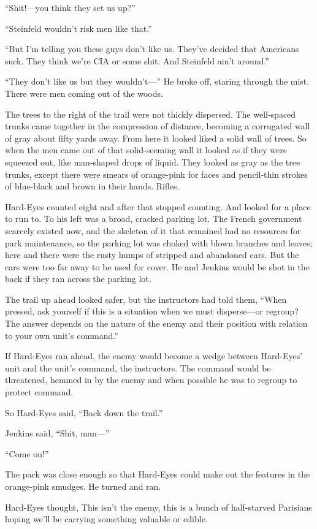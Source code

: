 ``Shit!—you think they set us up?''

``Steinfeld wouldn't risk men like that.''

``But I'm telling you these guys don't like us. They've decided that Americans suck. They think we're CIA or some shit. And Steinfeld ain't around.''

``They don't like us but they wouldn't—'' He broke off, staring through the mist. There were men coming out of the woods.

The trees to the right of the trail were not thickly dispersed. The well-spaced trunks came together in the compression of distance, becoming a corrugated wall of gray about fifty yards away. From here it looked liked a solid wall of trees. So when the men came out of that solid-seeming wall it looked as if they were squeezed out, like man-shaped drops of liquid. They looked as gray as the tree trunks, except there were smears of orange-pink for faces and pencil-thin strokes of blue-black and brown in their hands. Rifles.

Hard-Eyes counted eight and after that stopped counting. And looked for a place to run to. To his left was a broad, cracked parking lot. The French government scarcely existed now, and the skeleton of it that remained had no resources for park maintenance, so the parking lot was choked with blown branches and leaves; here and there were the rusty humps of stripped and abandoned cars. But the cars were too far away to be used for cover. He and Jenkins would be shot in the back if they ran across the parking lot.

The trail up ahead looked safer, but the instructors had told them, ``When pressed, ask yourself if this is a situation when we must disperse—or regroup? The answer depends on the nature of the enemy and their position with relation to your own unit's command.''

If Hard-Eyes ran ahead, the enemy would become a wedge between Hard-Eyes' unit and the unit's command, the instructors. The command would be threatened, hemmed in by the enemy and when possible he was to regroup to protect command.

So Hard-Eyes said, ``Back down the trail.''

Jenkins said, ``Shit, man—''

``Come on!''

The pack was close enough so that Hard-Eyes could make out the features in the orange-pink smudges. He turned and ran.

Hard-Eyes thought, This isn't the enemy, this is a bunch of half-starved Parisians hoping we'll be carrying something valuable or edible.

